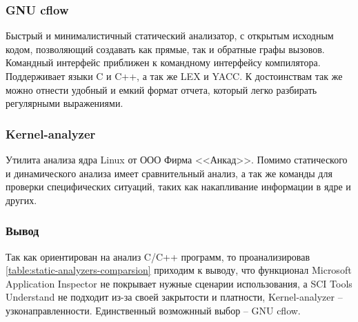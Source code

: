 \subsubsection{GNU cflow}\label{sec:ch1/sec3/sub1/sub3}
 Быстрый и минималистичный статический анализатор, с открытым исходным кодом,
 позволяющий создавать как прямые, так и обратные графы вызовов. 
 Командный интерфейс приближен к командному интерфейсу компилятора.
 Поддерживает языки C и C++, а так же LEX и YACC.
 К достоинствам так же можно отнести удобный и емкий формат отчета, который легко
 разбирать регулярными выражениями.

\subsubsection{Kernel-analyzer}\label{sec:ch1/sec3/sub1/sub3}
 Утилита анализа ядра Linux от ООО Фирма <<Анкад>>. Помимо статического и динамического
 анализа имеет сравнительный анализ, а так же команды для проверки специфических ситуаций,
 таких как накапливание информации в ядре и других.

\subsubsection{Вывод}\label{sec:ch1/sec3/sub1/sub4}
Так как {\ProgModule} ориентирован на анализ C/C++ программ, то проанализировав
\autoref{table:static-analyzers-comparsion} приходим к выводу, что функционал 
Microsoft Application Inspector не покрывает нужные сценарии использования, 
а SCI Tools Understand не подходит из-за своей закрытости и платности, Kernel-analyzer -- узконаправленности.
Единственный возможнный выбор -- GNU cflow. 

